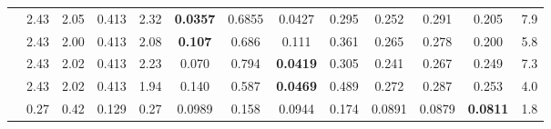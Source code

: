 \documentclass{article}
\begin{document}
\begin{table*}[t]
\begin{center}
{\begin{minipage}[t]{1.72\textwidth}
\begin{tabular}{lccc|cccc|cccc|c}
     & 2.43 &  2.05 & 0.413 & 2.32 & \textbf{0.0357} & 0.6855 & 0.0427 & \cellcolor[HTML]{E7FFE2}0.295 & 0.252 & \cellcolor[HTML]{E7FFE2}0.291 & 0.205 & 7.9\\
     & 2.43 &  2.00 & 0.413 & 2.08 & \textbf{0.107} & 0.686 & 0.111 &\cellcolor[HTML]{E7FFE2} 0.361 & 0.265 & \cellcolor[HTML]{E7FFE2}0.278 & 0.200 & 5.8\\
     & 2.43 & 2.02 & 0.413 & 2.23 & 0.070 & 0.794 & \textbf{0.0419} & \cellcolor[HTML]{E7FFE2}0.305 & 0.241 & \cellcolor[HTML]{E7FFE2}0.267 & 0.249 & 7.3\\
     & 2.43 & 2.02 & 0.413 & 1.94 & 0.140 & 0.587 & \textbf{0.0469} & \cellcolor[HTML]{E7FFE2}0.489 & 0.272 & \cellcolor[HTML]{E7FFE2}0.287 & 0.253 & 4.0\\
     & 0.27 &  0.42 & 0.129 & 0.27 & 0.0989 & 0.158 & 0.0944 & \cellcolor[HTML]{E7FFE2}0.174 & \cellcolor[HTML]{E7FFE2}0.0891 & \cellcolor[HTML]{E7FFE2}0.0879 & \cellcolor[HTML]{E7FFE2}\textbf{0.0811} & 1.8\\ 
  \bottomrule
\end{tabular}
\end{minipage}
}
\end{center}
\end{table*}
\end{document}
